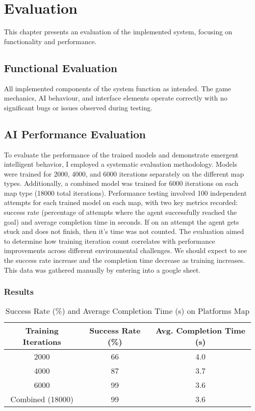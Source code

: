 \chapter{Evaluation}

This chapter presents an evaluation of the implemented system, focusing on functionality and performance.

\section{Functional Evaluation}
All implemented components of the system function as intended. The game mechanics, AI behaviour, and interface elements operate correctly with no significant bugs or issues observed during testing.

\section{AI Performance Evaluation}
To evaluate the performance of the trained models and demonstrate emergent intelligent behavior, I employed a systematic evaluation methodology. Models were trained for 2000, 4000, and 6000 iterations separately on the different map types. 
Additionally, a combined model was trained for 6000 iterations on each map type (18000 total iterations).
Performance testing involved 100 independent attempts for each trained model on each map, with two key metrics recorded: success rate (percentage of attempts where the agent successfully reached the goal) and average completion time in seconds.
If on an attempt the agent gets stuck and does not finish, then it's time was not counted.
The evaluation aimed to determine how training iteration count correlates with performance improvements across different environmental challenges. 
We should expect to see the success rate increase and the completion time decrease as training increases.
This data was gathered manually by entering into a google sheet.

\subsection{Results}

\begin{table}[H]
\centering
\caption{Success Rate (\%) and Average Completion Time (s) on Platforms Map}
\begin{tabular}{|c|c|c|}
\hline
\textbf{Training Iterations} & \textbf{Success Rate (\%)} & \textbf{Avg. Completion Time (s)} \\
\hline
2000 & 66 & 4.0 \\
\hline
4000 & 87 & 3.7 \\
\hline
6000 & 99 & 3.6 \\
\hline
Combined (18000) & 99 & 3.6 \\
\hline
\end{tabular}
\end{table}

